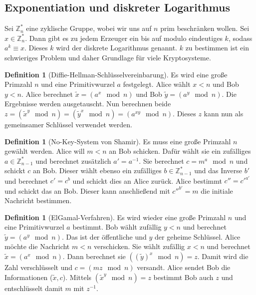 \documentclass[a4paper, 12pt]{article}
\theoremstyle{plain}
\theoremstyle{definition}
\newtheorem{definition}[theorem]{Definition} %
\theoremstyle{lemma}
\theoremstyle{remark}
\theoremstyle{corollary}
\theoremstyle{example}
\begin{document}
	\subsection{Exponentiation und diskreter Logarithmus}
	Sei $\mathbb{Z}_n^*$ eine zyklische Gruppe, wobei wir uns auf $n$ prim beschränken wollen. Sei $x \in \mathbb{Z}_n^*$. Dann gibt es zu jedem Erzeuger ein bis auf modulo eindeutiges $k$, sodass $a^k \equiv x$. Dieses $k$ wird der diskrete Logarithmus genannt. $k$ zu bestimmen ist ein schwieriges Problem und daher Grundlage für viele Kryptosysteme.
	\begin{definition}[Diffie-Hellman-Schlüsselvereinbarung]
		Es wird eine große Primzahl $n$ und eine Primitivwurzel $a$ festgelegt. Alice wählt $x<n$ und Bob $y<n$. Alice berechnet $\tilde{x} = (a^x \mod n)$ und Bob $\tilde{y} = (a^y \mod n)$. Die Ergebnisse werden ausgetauscht. Nun berechnen beide $z = (\tilde{x}^y \mod n) = (\tilde{y}^x \mod n) = (a^{xy} \mod n)$. Dieses $z$ kann nun als gemeinsamer Schlüssel verwendet werden.
	\end{definition}
	\begin{definition}[No-Key-System von Shamir]
		Es muss eine große Primzahl $n$ gewählt werden. Alice will $m<n$ an Bob schicken. Dafür wählt sie ein zufälliges $a \in \mathbb{Z}_{n-1}^*$ und berechnet zusätzlich $a' = a^{-1}$. Sie berechnet $c = m^a \mod n$ und schickt $c$ an Bob. Dieser wählt ebenso ein zufälliges $b \in \mathbb{Z}_{n-1}^*$ und das Inverse $b'$ und berechnet $c' = c^b$ und schickt dies an Alice zurück. Alice bestimmt $c'' = c'^{a'}$ und schickt das an Bob. Dieser kann anschließend mit $c''^{b'} = m$ die initiale Nachricht bestimmen.
	\end{definition}
	\begin{definition}[ElGamal-Verfahren]
		Es wird wieder eine große Primzahl $n$ und eine Primitivwurzel $a$ bestimmt. Bob wählt zufällig $y < n$ und berechnet $\tilde{y} = (a^y \mod n)$. Das ist der öffentliche und $y$ der geheime Schlüssel. Alice möchte die Nachricht $m < n$ verschicken. Sie wählt zufällig $x<n$ und berechnet $\tilde{x} = (a^x \mod n)$. Dann berechnet sie $((\tilde{y})^x \mod n) = z$. Damit wird die Zahl verschlüsselt und $c = (mz \mod n)$ versandt. Alice sendet Bob die Informationen ($\tilde{x},c$). Mittels $(\tilde{x}^y \mod n) = z$ bestimmt Bob auch $z$ und entschlüsselt damit $m$ mit $z^{-1}$.
	\end{definition}
\end{document}

